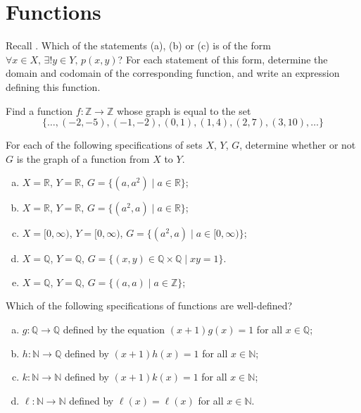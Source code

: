 \section{Functions}


\begin{exercise}
Recall . Which of the statements (a), (b) or (c) is of the form $\forall x \in X,\, \exists ! y \in Y,\, p(x,y)$? For each statement of this form, determine the domain and codomain of the corresponding function, and write an expression defining this function.
\end{exercise}

\begin{exercise}
Find a function $f : \mathbb{Z} \to \mathbb{Z}$ whose graph is equal to the set
\[ \{ \dots, ({-2}, {-5}), ({-1}, {-2}), (0, 1), (1, 4), (2, 7), (3, 10), \dots \} \]
\end{exercise}


\begin{exercise}
For each of the following specifications of sets $X$, $Y$, $G$, determine whether or not $G$ is the graph of a function from $X$ to $Y$.
\begin{enumerate}[(a)]
\item $X = \mathbb{R}$, $Y = \mathbb{R}$, $G = \{ (a, a^2) \mid a \in \mathbb{R} \}$;
\item $X = \mathbb{R}$, $Y = \mathbb{R}$, $G = \{ (a^2, a) \mid a \in \mathbb{R} \}$;
\item $X = [0, \infty)$, $Y = [0, \infty)$, $G = \{ (a^2, a) \mid a \in [0, \infty) \}$;
\item $X = \mathbb{Q}$, $Y = \mathbb{Q}$, $G = \{ (x, y) \in \mathbb{Q} \times \mathbb{Q} \mid xy = 1 \}$.
\item $X = \mathbb{Q}$, $Y = \mathbb{Q}$, $G = \{ (a, a) \mid a \in \mathbb{Z} \}$;
\end{enumerate}
\end{exercise}


\begin{exercise}
Which of the following specifications of functions are well-defined?
\begin{enumerate}[(a)]
\item $g : \mathbb{Q} \to \mathbb{Q}$ defined by the equation $(x+1)g(x)=1$ for all $x \in \mathbb{Q}$;
\item $h : \mathbb{N} \to \mathbb{Q}$ defined by $(x+1)h(x)=1$ for all $x \in \mathbb{N}$;
\item $k : \mathbb{N} \to \mathbb{N}$ defined by $(x+1)k(x)=1$ for all $x \in \mathbb{N}$;
\item $\ell : \mathbb{N} \to \mathbb{N}$ defined by $\ell(x)=\ell(x)$ for all $x \in \mathbb{N}$.
\end{enumerate}
\end{exercise}

